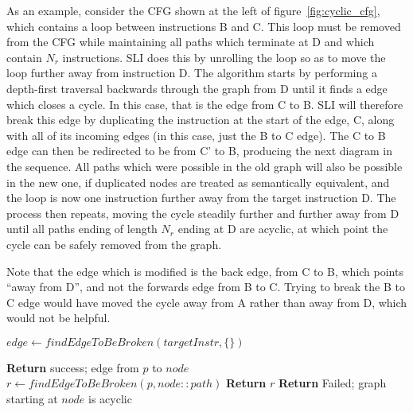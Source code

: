 As an example, consider the CFG shown at the left of
figure~\ref{fig:cyclic_cfg}, which contains a loop between
instructions B and C.  This loop must be removed from the CFG while
maintaining all paths which terminate at D and which contain $N_r$
instructions.  SLI does this by unrolling the loop so as to move the
loop further away from instruction D.  The algorithm starts by
performing a depth-first traversal backwards through the graph from D
until it finds a edge which closes a cycle.  In this case, that is the
edge from C to B.  SLI will therefore break this edge by duplicating
the instruction at the start of the edge, C, along with all of its
incoming edges (in this case, just the B to C edge).  The C to B edge
can then be redirected to be from C' to B, producing the next diagram
in the sequence.  All paths which were possible in the old graph will
also be possible in the new one, if duplicated nodes are treated as
semantically equivalent, and the loop is now one instruction further
away from the target instruction D.  The process then repeats, moving
the cycle steadily further and further away from D until all paths
ending of length $N_r$ ending at D are acyclic, at which point the
cycle can be safely removed from the graph.

Note that the edge which is modified is the back edge, from C to B,
which points ``away from D'', and not the forwards edge from B to C.
Trying to break the B to C edge would have moved the cycle away from A
rather than away from D, which would not be helpful.

\begin{algorithmic}[1]
     \State $edge \gets findEdgeToBeBroken(targetInstr, \{\})$
     \Else
        \EndFor
     \EndIf
  \EndWhile
\end{algorithmic}

\begin{algorithmic}
         \State \textbf{Return} {success; edge from $p$ to $node$}
     \EndIf
     \State $r \gets findEdgeToBeBroken(p, node::path)$
         \State \textbf{Return} {$r$}
     \EndIf
  \EndFor
  \State \textbf{Return} {Failed; graph starting at $node$ is acyclic}
  \EndProcedure
\end{algorithmic}

